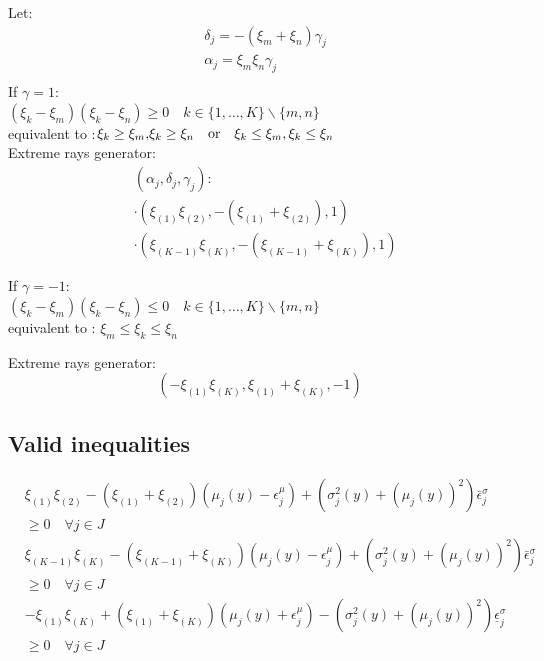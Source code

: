 \documentclass{beamer}
\begin{document}
\begin{frame} Let:
	\begin{equation}
		\begin{aligned}
		& \delta_j= -(\xi_m+\xi_n)\gamma_j \\
		& \alpha_j=\xi_m\xi_n\gamma_j\\
		\end{aligned}
	\end{equation}
	If $\gamma=1$:\\
	\quad$(\xi_k - \xi_m)(\xi_k-\xi_n)\geq0 \quad k \in\{1, \ldots, K\} \backslash\{m, n\}$\\
	\quad equivalent to :$\xi_k\geq\xi_m\text,\xi_k\geq\xi_n\quad\text{or}\quad\xi_k\leq\xi_m,\xi_k\leq\xi_n$\\
	Extreme rays generator:
	\begin{equation}
		\begin{aligned}
		& \left(\alpha_j, \delta_j, \gamma_j\right): \\
		& \cdot\left(\xi_{(1)} \xi_{(2)},-\left(\xi_{(1)}+\xi_{(2)}\right), 1\right) \\
		& \cdot\left(\xi_{(K-1)} \xi_{(K)},-\left(\xi_{(K-1)}+\xi_{(K)}\right), 1\right)
		\end{aligned}
	\end{equation}


	If $\gamma=-1$:\\
	\quad$(\xi_k - \xi_m)(\xi_k-\xi_n)\leq0 \quad k \in\{1, \ldots, K\} \backslash\{m, n\}$\\
	\quad equivalent to : $\xi_m\leq\xi_k\leq\xi_n$
	
	Extreme rays generator:\\
	\begin{equation}
		\left(-\xi_{(1)} \xi_{(K)}, \xi_{(1)}+\xi_{(K)},-1\right)
	\end{equation}
\end{frame}	

\subsection{Valid inequalities}
\begin{frame}
	\begin{equation}
		\begin{aligned}
		& \xi_{(1)} \xi_{(2)}-\left(\xi_{(1)}+\xi_{(2)}\right)\left(\mu_j(y)-\epsilon_j^\mu\right)+\left(\sigma_j^2(y)+\left(\mu_j(y)\right)^2\right) \bar{\epsilon}_j^\sigma \\
		& \geq 0 \quad \forall j \in J \\
		& \xi_{(K-1)} \xi_{(K)}-\left(\xi_{(K-1)}+\xi_{(K)}\right)\left(\mu_j(y)-\epsilon_j^\mu\right)+\left(\sigma_j^2(y)+\left(\mu_j(y)\right)^2\right) \bar{\epsilon}_j^\sigma \\
		& \geq 0 \quad \forall j \in J \\
		& -\xi_{(1)} \xi_{(K)}+\left(\xi_{(1)}+\xi_{(K)}\right)\left(\mu_j(y)+\epsilon_j^\mu\right)-\left(\sigma_j^2(y)+\left(\mu_j(y)\right)^2\right) \underline{\epsilon}_j^\sigma \\
		& \geq 0 \quad \forall j \in J
		\end{aligned}
	\end{equation}
\end{frame}	
\end{document}
